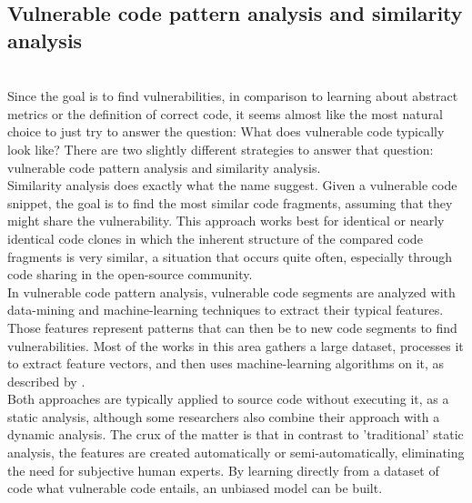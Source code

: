 \documentclass[
a4paper,
pagesize,
pdftex,
12pt,
twoside, %
BCOR=5mm, %
ngerman,
fleqn,
final,
]{scrartcl}
\begin{document}
	\subsection{Vulnerable code pattern analysis and similarity analysis}\mbox{}\\
	Since the goal is to find vulnerabilities, in comparison to learning about abstract metrics or the definition of correct code, it seems almost like the most natural choice to just try to answer the question: What does vulnerable code typically look like? There are two slightly different strategies to answer that question: vulnerable code pattern analysis and similarity analysis.\\
	Similarity analysis does exactly what the name suggest. Given a vulnerable code snippet, the goal is to find the most similar code fragments, assuming that they might share the vulnerability. This approach works best for identical or nearly identical code clones in which the inherent structure of the compared code fragments is very similar\cite{Li.2018}, a situation that occurs quite often, especially through code sharing in the open-source community.\\
	In vulnerable code pattern analysis, vulnerable code segments are analyzed with data-mining and machine-learning techniques to extract their typical features. Those features represent patterns that can then be to new code segments to find vulnerabilities. Most of the works in this area gathers a large dataset, processes it to extract feature vectors, and then uses machine-learning algorithms on it, as described by \citep{Ghaffarian.2017}.\\
	Both approaches are typically applied to source code without executing it, as a static analysis, although some researchers also combine their approach with a dynamic analysis. The crux of the matter is that in contrast to 'traditional' static analysis, the features are created automatically or semi-automatically, eliminating the need for subjective human experts. By learning directly from a dataset of code what vulnerable code entails, an unbiased model can be built.\\
	
\end{document}
